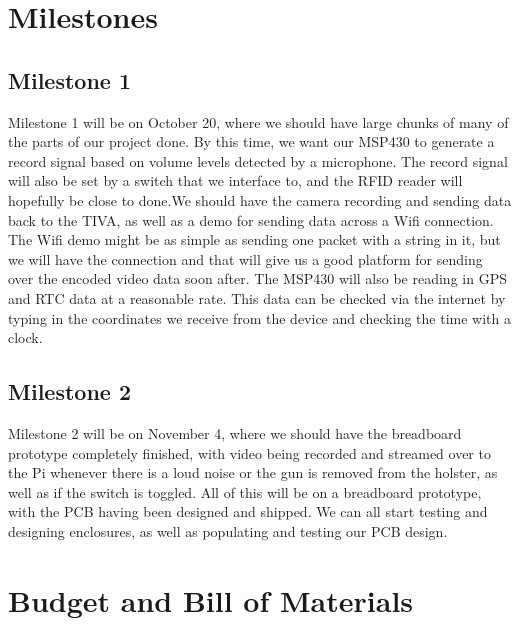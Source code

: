 \documentclass[12pt]{article}
\begin{document}
\section{Milestones}

\subsection{Milestone 1}

Milestone 1 will be on October 20, where we should have large chunks of many of
the parts of our project done. By this time, we want our MSP430 to generate a
record signal based on volume levels detected by a microphone. The record
signal will also be set by a switch that we interface to, and the RFID reader
will hopefully be close to done.We should have the camera recording and sending
data back to the TIVA, as well as a demo for sending data across a Wifi
connection. The Wifi demo might be as simple as sending one packet with a
string in it, but we will have the connection and that will give us a good
platform for sending over the encoded video data soon after. The MSP430 will
also be reading in GPS and RTC data at a reasonable rate. This data can be
checked via the internet by typing in the coordinates we receive from the
device and checking the time with a clock. 

\subsection{Milestone 2}

Milestone 2 will be on November 4, where we should have the breadboard
prototype completely finished, with video being recorded and streamed over to
the Pi whenever there is a loud noise or the gun is removed from the holster,
as well as if the switch is toggled. All of this will be on a breadboard
prototype, with the PCB having been designed and shipped.  We can all start
testing and designing enclosures, as well as populating and testing our PCB
design.

\section{Budget and Bill of Materials}
\end{document}
